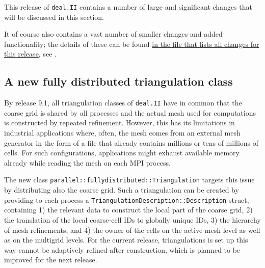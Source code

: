 \documentclass{ansarticle-preprint}
\newcommand{\specialword}[1]{\texttt{#1}}
\newcommand{\dealii}{{\specialword{deal.II}}\xspace}
\begin{document}
This release of \dealii contains a number of large and significant changes
that will be discussed in this section.

It of course also contains a
vast number of smaller changes and added functionality; the details of these
can be found
\href{https://dealii.org/developer/doxygen/deal.II/changes_between_9_0_1_and_9_1_0.html}{
in the file that lists all changes for this release}, see \cite{changes91}.


\subsection{A new fully distributed triangulation class}
\label{subsec:pft}

By release 9.1, all triangulation classes of \texttt{deal.II} have in common that the coarse grid is shared by
all processes and the actual mesh used for computations is constructed by repeated
refinement. However, this has its limitations in industrial applications where, often, the mesh comes
from an external mesh generator in the form of a file that already contains millions
or tens of millions of cells. For such configurations, applications might exhaust
available memory already while reading the mesh on each MPI process.

The new class \texttt{parallel::fullydistributed::Triangulation} targets this issue
by distributing also the coarse grid. Such
a triangulation can be created by providing to each process a \texttt{Triangulation\-De\-scrip\-tion::Description} struct, containing
1) the relevant data to construct the local part of the coarse grid, 2) the
translation of the local coarse-cell IDs to globally unique IDs, 3) the hierarchy
of mesh refinements, and 4) the owner of the cells on the active mesh level as well
as on the multigrid levels. For the current release, triangulations is set up
this way cannot be adaptively refined after construction, which is planned to be
improved for the next release.

\end{document}
